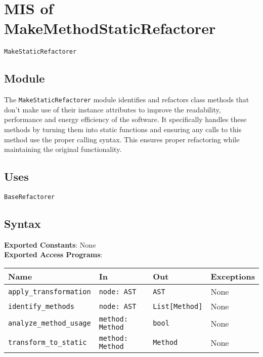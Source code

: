 \documentclass[12pt, titlepage]{article}
\begin{document}
  
\newpage

\section{MIS of MakeMethodStaticRefactorer} \label{mis:MakeStatic}

\texttt{MakeStaticRefactorer}

\subsection{Module}

The \texttt{MakeStaticRefactorer} module identifies and refactors 
class methods that don't make use of their instance attributes to improve the readability, performance and energy efficiency of the software. It specifically handles these methods by turning them into static functions and ensuring any calls to this method use the proper calling syntax. This ensures proper refactoring while maintaining the original functionality.

\subsection{Uses}

\texttt{BaseRefactorer}

\subsection{Syntax}

\noindent
\textbf{Exported Constants}: None\\

\noindent
\textbf{Exported Access Programs}:\\

\begin{tabularx}{\linewidth}{|l|>{\raggedright\arraybackslash}X|l|l|}
\hline
\textbf{Name} & \textbf{In} & \textbf{Out} & \textbf{Exceptions} \\\hline
\texttt{apply\_transformation} & \texttt{node: AST} & \texttt{AST} & None \\\hline
\texttt{identify\_methods} & \texttt{node: AST} & \texttt{List[Method]} & None \\\hline
\texttt{analyze\_method\_usage} & \texttt{method: Method} & \texttt{bool} & None \\\hline
\texttt{transform\_to\_static} & \texttt{method: Method} & \texttt{Method} & None \\\hline
\end{tabularx}
\end{document}
